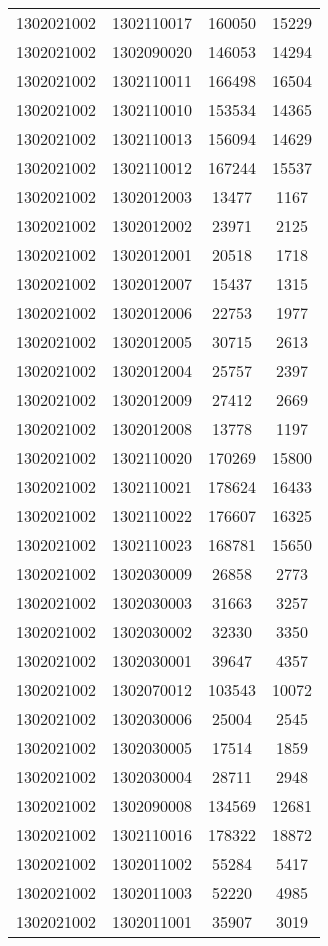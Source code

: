 \begin{longtable}[h]{llcc}
		1302021002 & 1302110017 & 160050 & 15229\\
		1302021002 & 1302090020 & 146053 & 14294\\
		1302021002 & 1302110011 & 166498 & 16504\\
		1302021002 & 1302110010 & 153534 & 14365\\
		1302021002 & 1302110013 & 156094 & 14629\\
		1302021002 & 1302110012 & 167244 & 15537\\
		1302021002 & 1302012003 & 13477 & 1167\\
		1302021002 & 1302012002 & 23971 & 2125\\
		1302021002 & 1302012001 & 20518 & 1718\\
		1302021002 & 1302012007 & 15437 & 1315\\
		1302021002 & 1302012006 & 22753 & 1977\\
		1302021002 & 1302012005 & 30715 & 2613\\
		1302021002 & 1302012004 & 25757 & 2397\\
		1302021002 & 1302012009 & 27412 & 2669\\
		1302021002 & 1302012008 & 13778 & 1197\\
		1302021002 & 1302110020 & 170269 & 15800\\
		1302021002 & 1302110021 & 178624 & 16433\\
		1302021002 & 1302110022 & 176607 & 16325\\
		1302021002 & 1302110023 & 168781 & 15650\\
		1302021002 & 1302030009 & 26858 & 2773\\
		1302021002 & 1302030003 & 31663 & 3257\\
		1302021002 & 1302030002 & 32330 & 3350\\
		1302021002 & 1302030001 & 39647 & 4357\\
		1302021002 & 1302070012 & 103543 & 10072\\
		1302021002 & 1302030006 & 25004 & 2545\\
		1302021002 & 1302030005 & 17514 & 1859\\
		1302021002 & 1302030004 & 28711 & 2948\\
		1302021002 & 1302090008 & 134569 & 12681\\
		1302021002 & 1302110016 & 178322 & 18872\\
		1302021002 & 1302011002 & 55284 & 5417\\
		1302021002 & 1302011003 & 52220 & 4985\\
		1302021002 & 1302011001 & 35907 & 3019\\

\end{longtable}

